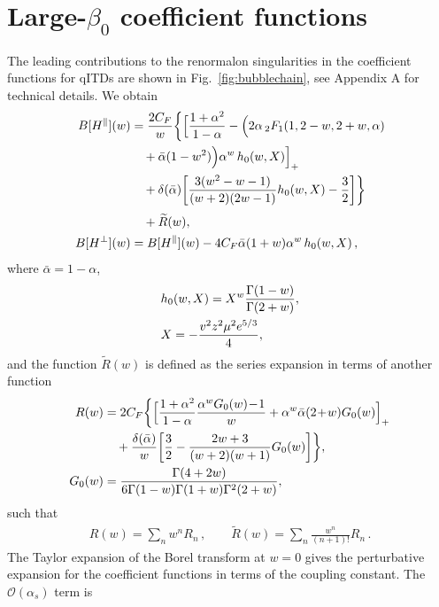 \section{Large-$\beta_0$ coefficient functions}\label{sect_bubbles}%
%

The leading contributions to the renormalon singularities in the coefficient functions for qITDs are shown in Fig.~\ref{fig:bubblechain},
see Appendix A for technical details. We obtain   
\begin{align}
\label{B[H]}
B[H^\parallel](w)&=\frac{2C_F}{w} \biggl\{\Big[\frac{1+\alpha^2}{1-\alpha}
- \Big(2\alpha\,{}_2F_1(1,2-w,2+w,\alpha)
\notag\\&\quad
 +\bar \alpha (1-w^2)\Big)\alpha^w\,h_0(w,X)\Big]_+
\notag\\ &\quad
+\delta(\bar \alpha)\bigg[\frac{3(w^2-w-1)}{(w+2)(2w-1)}h_0(w,X)-\frac{3}{2}\bigg]\biggr\}
\notag\\[1mm] &\quad
+\widetilde{R}(w),
\\
B[H^\perp](w)&= B[H^\parallel](w)-4C_F \bar \alpha(1+w)\alpha^w\,h_0(w,X)\,,
\end{align}
where $\bar\alpha = 1-\alpha$,
\begin{align}
& h_0(w,X)=X^w \frac{\Gamma(1-w)}{\Gamma(2+w)},
\notag\\
&X=- \frac{v^2 z^2 \mu^2 e^{5/3}}{4},
\end{align}
and the function $\widetilde{R}(w)$ is defined as the series expansion in terms of another function
\begin{align}
R(w)&=2C_F \biggl\{\Big[\frac{1+\alpha^2}{1-\alpha}\frac{\alpha^wG_0(w)\!-\!1}{w}+\alpha^w \bar \alpha (2\!+\!w)G_0(w)\Big]_+
\notag\\&\quad
+\frac{\delta(\bar \alpha)}{w}\bigg[\frac{3}{2}-\frac{2w+3}{(w+2)(w+1)}G_0(w)\bigg]\biggr\},
\notag\\
G_0(w)&=\frac{\Gamma(4+2w)}{6\Gamma(1-w)\Gamma(1+w)\Gamma^2(2+w)},
\end{align}
such that
\begin{align}
  R(w) = \sum_n w^n R_n\,, \qquad \widetilde{R}(w) = \sum_n \frac{w^n}{(n+1)!} R_n \,.
\end{align}
The Taylor expansion of the Borel transform at $w=0$ gives the perturbative expansion for the coefficient functions in terms of the coupling constant. 
The $\mathcal{O}(\alpha_s)$ term is
